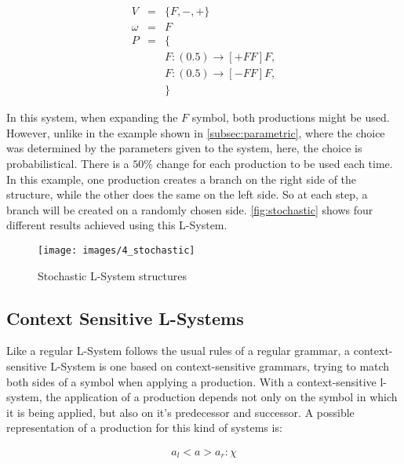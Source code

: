 \documentclass{acmtog}
\begin{document}
\begin{eqnarray*}
  V       &=& \{F, -, +\}                   \\
  \omega  &=& F                             \\
  P       &=& \{                            \\
          & & F : (0.5) \rightarrow [+FF]F, \\
          & & F : (0.5) \rightarrow [-FF]F, \\
          & & \}                            
  \label{eq:example4}
\end{eqnarray*}

In this system, when expanding the $F$ symbol, both productions might be used. However, unlike in the example shown in \autoref{subsec:parametric}, where the choice was determined by the parameters given to the system, here, the choice is probabilistical. There is a $50\%$ change for each production to be used each time. In this example, one production creates a branch on the right side of the structure, while the other does the same on the left side. So at each step, a branch will be created on a randomly chosen side. \autoref{fig:stochastic} shows four different results achieved using this L-System.

\begin{figure}[!htp]
  \begin{center}
    \texttt{[image: images/4\_stochastic]}
    \caption{Stochastic L-System structures \label{fig:stochastic}}
    \end{center}
\end{figure}

\subsection{Context Sensitive L-Systems}
\label{subsec:context}

Like a regular L-System follows the usual rules of a regular grammar, a context-sensitive L-System is one based on context-sensitive grammars, trying to match both sides of a symbol when applying a production. With a context-sensitive l-system, the application of a production depends not only on the symbol in which it is being applied, but also on it's predecessor and successor. A possible representation of a production for this kind of systems is:

\begin{eqnarray*}
  a_{l} < a > a_{r} : \chi \\
\end{eqnarray*}
\end{document}

